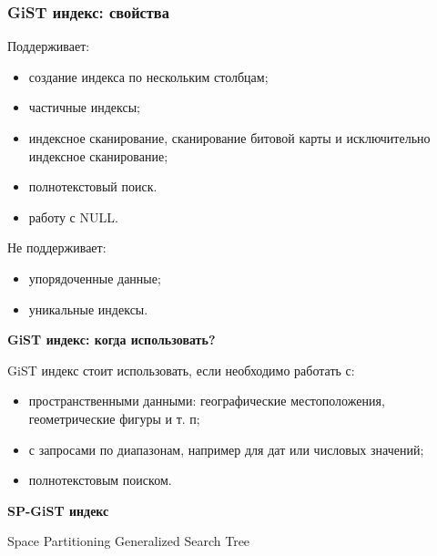 \documentclass[aspectratio=169]{beamer}
\begin{document}
\begin{frame}
  \frametitle{GiST индекс: свойства}

  Поддерживает:
  \begin{itemize}
    \item создание индекса по нескольким столбцам;
    \item частичные индексы;
    \item индексное сканирование, сканирование битовой карты и исключительно
    индексное сканирование;
    \item полнотекстовый поиск.
    \item работу с NULL.
  \end{itemize}

  Не поддерживает:
  \begin{itemize}
    \item упорядоченные данные;
    \item уникальные индексы.
  \end{itemize}
\end{frame}


\begin{frame}
  \vspace*{1em}
  \begin{center}
    {\LARGE \textbf{GiST индекс: когда использовать?}}

    \vspace*{1em}
  \end{center}

  GiST индекс стоит использовать, если необходимо работать с:
  \begin{itemize}
    \item пространственными данными: географические местоположения,
    геометрические фигуры и т. п;
    \item с запросами по диапазонам, например для дат или числовых значений;
    \item полнотекстовым поиском.
  \end{itemize}
\end{frame}

\begin{frame}
  \vspace*{1em}
  \begin{center}
    {\huge \textbf{SP-GiST индекс}}

    \vspace*{1em}

    Space Partitioning Generalized Search Tree
  \end{center}
\end{frame}
\end{document}
